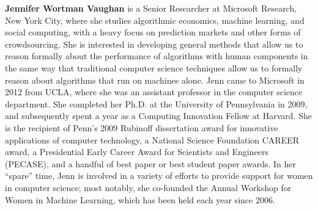 \begin{bio}
  {\bfseries Jennifer Wortman Vaughan} is a Senior Researcher at Microsoft Research, New York City, where she studies algorithmic economics, machine learning, and social computing, with a heavy focus on prediction markets and other forms of crowdsourcing. She is interested in developing general methods that allow us to reason formally about the performance of algorithms with human components in the same way that traditional computer science techniques allow us to formally reason about algorithms that run on machines alone. Jenn came to Microsoft in 2012 from UCLA, where she was an assistant professor in the computer science department. She completed her Ph.D. at the University of Pennsylvania in 2009, and subsequently spent a year as a Computing Innovation Fellow at Harvard. She is the recipient of Penn’s 2009 Rubinoff dissertation award for innovative applications of computer technology, a National Science Foundation CAREER award, a Presidential Early Career Award for Scientists and Engineers (PECASE), and a handful of best paper or best student paper awards. In her “spare” time, Jenn is involved in a variety of efforts to provide support for women in computer science; most notably, she co-founded the Annual Workshop for Women in Machine Learning, which has been held each year since 2006.
\end{bio}


